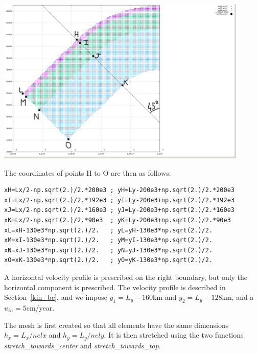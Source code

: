 \begin{center}
\includegraphics[width=12cm]{python_codes/fieldstone_67/images/mats3}
\end{center}

The coordinates of points H to O are then as follows:

\begin{lstlisting}
xH=Lx/2-np.sqrt(2.)/2.*200e3 ; yH=Ly-200e3+np.sqrt(2.)/2.*200e3
xI=Lx/2-np.sqrt(2.)/2.*192e3 ; yI=Ly-200e3+np.sqrt(2.)/2.*192e3
xJ=Lx/2-np.sqrt(2.)/2.*160e3 ; yJ=Ly-200e3+np.sqrt(2.)/2.*160e3
xK=Lx/2-np.sqrt(2.)/2.*90e3  ; yK=Ly-200e3+np.sqrt(2.)/2.*90e3
xL=xH-130e3*np.sqrt(2.)/2.   ; yL=yH-130e3*np.sqrt(2.)/2.
xM=xI-130e3*np.sqrt(2.)/2.   ; yM=yI-130e3*np.sqrt(2.)/2.
xN=xJ-130e3*np.sqrt(2.)/2.   ; yN=yJ-130e3*np.sqrt(2.)/2.
xO=xK-130e3*np.sqrt(2.)/2.   ; yO=yK-130e3*np.sqrt(2.)/2.
\end{lstlisting}

A horizontal velocity profile is prescribed on the right boundary, but 
only the horizontal component is prescribed. 
The velocity profile is described in Section~\ref{kin_bc}, and we 
impose $y_1=L_y-160$km and $y_2=L_y-128$km, and a $u_{in}=5$cm/year.

The mesh is first created so that all elements have the same dimensions $h_x=L_x/nelx$ and $h_y=L_y/nely$.
It is then stretched using the two functions {\sl stretch\_towards\_center} and 
{\sl stretch\_towards\_top}.

